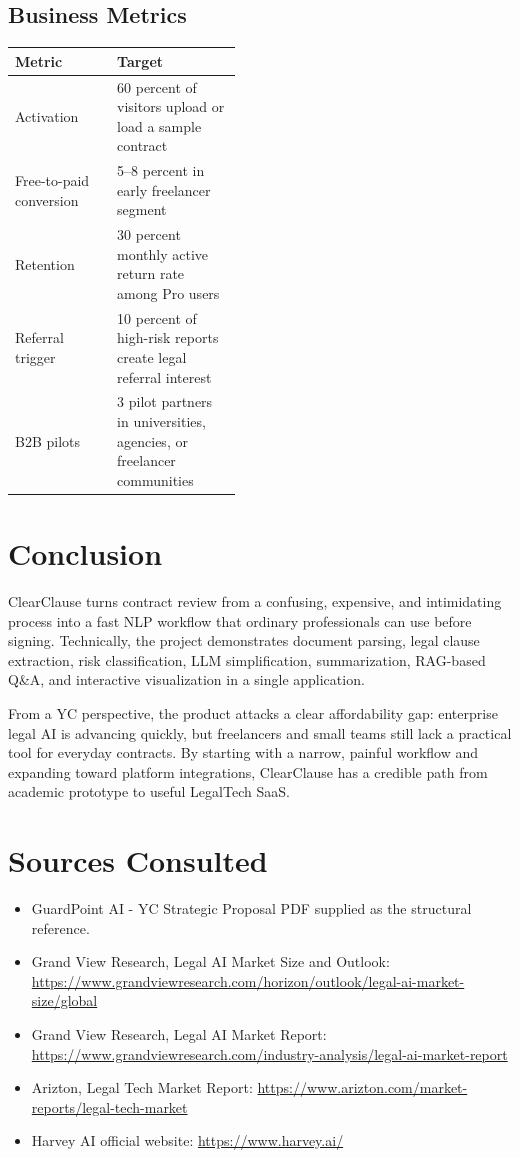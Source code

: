 \documentclass[11pt,a4paper]{article}
\begin{document}
\subsection{Business Metrics}

\begin{tabularx}{\linewidth}{L{0.45\linewidth}Y}
\toprule
\textbf{Metric} & \textbf{Target} \\
\midrule
Activation & 60 percent of visitors upload or load a sample contract \\
Free-to-paid conversion & 5--8 percent in early freelancer segment \\
Retention & 30 percent monthly active return rate among Pro users \\
Referral trigger & 10 percent of high-risk reports create legal referral interest \\
B2B pilots & 3 pilot partners in universities, agencies, or freelancer communities \\
\bottomrule
\end{tabularx}

\section{Conclusion}

ClearClause turns contract review from a confusing, expensive, and intimidating process into a fast NLP workflow that ordinary professionals can use before signing. Technically, the project demonstrates document parsing, legal clause extraction, risk classification, LLM simplification, summarization, RAG-based Q\&A, and interactive visualization in a single application.

From a YC perspective, the product attacks a clear affordability gap: enterprise legal AI is advancing quickly, but freelancers and small teams still lack a practical tool for everyday contracts. By starting with a narrow, painful workflow and expanding toward platform integrations, ClearClause has a credible path from academic prototype to useful LegalTech SaaS.

\section*{Sources Consulted}

{\footnotesize
\begin{itemize}
\item GuardPoint AI - YC Strategic Proposal PDF supplied as the structural reference.
\item Grand View Research, Legal AI Market Size and Outlook: \url{https://www.grandviewresearch.com/horizon/outlook/legal-ai-market-size/global}
\item Grand View Research, Legal AI Market Report: \url{https://www.grandviewresearch.com/industry-analysis/legal-ai-market-report}
\item Arizton, Legal Tech Market Report: \url{https://www.arizton.com/market-reports/legal-tech-market}
\item Harvey AI official website: \url{https://www.harvey.ai/}
\end{itemize}
}
\end{document}
